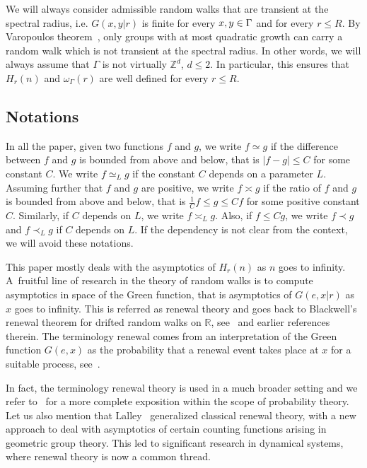 \documentclass[10pt]{amsart}
\theoremstyle{definition}\newtheorem{defi}[theo]{Definition}\newtheorem{rema}[theo]{Remark}\newtheorem{exam}[theo]{Example}\newtheorem{exem}[theo]{Example}\newtheorem{nota}[theo]{Notation}
\newcommand{\Z}{\mathbb{Z}}
\newcommand{\R}{\mathbb{R}}
\let\oldin\in
\renewcommand{\in}{\mathchoice{\oldin}{\oldin}{\,\oldin\,}{\,\oldin\,}}
\begin{document}
We will always consider admissible random walks that are transient at the spectral radius, i.e. $G(x,y|r)$ is finite for every $x,y\in \Gamma$ and for every $r\leq R$. By Varopoulos theorem~\cite[Theorem~7.8]{Woessbook}, only groups with at most quadratic growth can carry a random walk which is not transient at the spectral radius. In other words, we will always assume that $\Gamma$ is not virtually $\Z^d$, $d\leq 2$. In particular, this ensures that $H_r(n)$ and $\omega_\Gamma(r)$ are well defined for every $r\leq R$.

\subsection*{Notations}
In all the paper, given two functions $f$ and $g$, we write $f\simeq g$ if the difference between $f$ and $g$ is bounded from above and below, that is $|f-g|\leq C$ for some constant $C$. We write $f\simeq_L g$ if the constant $C$ depends on a parameter $L$. Assuming further that $f$ and $g$ are positive, we write $f\asymp g$ if the ratio of $f$ and $g$ is bounded\pagebreak{} from above and below, that is $\frac{1}{C}f\leq g\leq Cf$ for some positive constant $C$. Similarly, if $C$ depends on $L$, we write $f\asymp_L g$. Also, if $f\leq Cg$, we write $f\prec g$ and $f\prec_L g$ if $C$ depends on $L$. If the dependency is not clear from the context, we will avoid these notations.


This paper mostly deals with the asymptotics of $H_r(n)$ as $n$ goes to infinity. A~fruitful line of research in the theory of random walks is to compute asymptotics in space of the Green function, that is asymptotics of $G(e,x|r)$ as $x$ goes to infinity. This is referred as renewal theory and goes back to Blackwell's renewal theorem for drifted random walks on $\R$, see~\cite{Blackwell} and earlier references therein. The terminology renewal comes from an interpretation of the Green function $G(e,x)$ as the probability that a renewal event takes place at $x$ for a suitable process, see~\cite[Chapter~II.9]{Spitzer}.

In fact, the terminology renewal theory is used in a much broader setting and we refer to~\cite[Chapter~XI]{Feller} for a more complete exposition within the scope of probability theory. Let us also mention that Lalley~\cite{Lalleyrenewal} generalized classical renewal theory, with a new approach to deal with asymptotics of certain counting functions arising in geometric group theory. This led to significant research in dynamical systems, where renewal theory is now a common thread.
\end{document}
